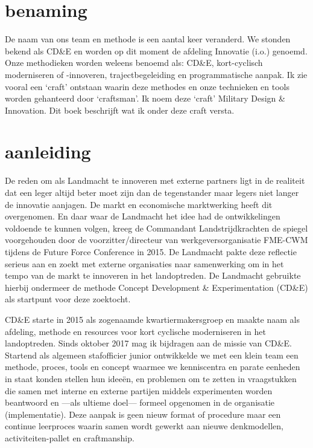 \documentclass[
]{book}
\begin{document}
\hypertarget{benaming}{%
\section{benaming}\label{benaming}}

De naam van ons team en methode is een aantal keer veranderd. We stonden bekend als CD\&E en worden op dit moment de afdeling Innovatie (i.o.) genoemd. Onze methodieken worden weleens benoemd als: CD\&E, kort-cyclisch moderniseren of -innoveren, trajectbegeleiding en programmatische aanpak. Ik zie vooral een `craft' ontstaan waarin deze methodes en onze technieken en tools worden gehanteerd door `craftsman'. Ik noem deze `craft' Military Design \& Innovation. Dit boek beschrijft wat ik onder deze craft versta.

\hypertarget{aanleiding}{%
\section{aanleiding}\label{aanleiding}}

De reden om als Landmacht te innoveren met externe partners ligt in de realiteit dat een leger altijd beter moet zijn dan de tegenstander maar legers niet langer de innovatie aanjagen. De markt en economische marktwerking heeft dit overgenomen. En daar waar de Landmacht het idee had de ontwikkelingen voldoende te kunnen volgen, kreeg de Commandant Landstrijdkrachten de spiegel voorgehouden door de voorzitter/directeur van werkgeversorganisatie FME-CWM tijdens de Future Force Conference in 2015. De Landmacht pakte deze reflectie serieus aan en zoekt met externe organisaties naar samenwerking om in het tempo van de markt te innoveren in het landoptreden. De Landmacht gebruikte hierbij ondermeer de methode Concept Development \& Experimentation (CD\&E) als startpunt voor deze zoektocht.

CD\&E starte in 2015 als zogenaamde kwartiermakersgroep en maakte naam als afdeling, methode en resources voor kort cyclische moderniseren in het landoptreden. Sinds oktober 2017 mag ik bijdragen aan de missie van CD\&E. Startend als algemeen stafofficier junior ontwikkelde we met een klein team een methode, proces, tools en concept waarmee we kenniscentra en parate eenheden in staat konden stellen hun ideeën, en problemen om te zetten in vraagstukken die samen met interne en externe partijen middels experimenten worden beantwoord en ---als ultieme doel--- formeel opgenomen in de organisatie (implementatie). Deze aanpak is geen nieuw format of procedure maar een continue leerproces waarin samen wordt gewerkt aan nieuwe denkmodellen, activiteiten-pallet en craftmanship.
\end{document}

